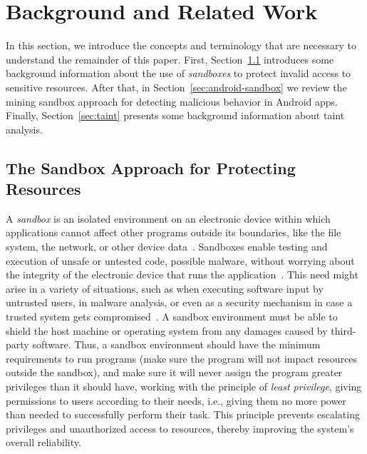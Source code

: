 \section{Background and Related Work}


In this section, we introduce the concepts and terminology that are necessary to understand the remainder of this paper. First, Section~\ref{sec:sandbox} introduces some background information about the use of \emph{sandboxes} to protect invalid access to sensitive resources. After that, in Section~\ref{sec:android-sandbox} we review the mining sandbox approach for detecting malicious behavior in Android apps. Finally, Section~\ref{sec:taint} presents some background information about taint analysis.

\subsection{The Sandbox Approach for Protecting Resources}\label{sec:sandbox}

A \emph{sandbox} is an isolated environment on an electronic device within which applications cannot affect other programs outside its boundaries, like the file system, the network, or other device data~\cite{DBLP:journals/peerj-cs/MaassSCS16}. Sandboxes enable testing and execution of unsafe or untested code, possible malware, without worrying about the integrity of the electronic device that runs the application~\cite{DBLP:conf/esorics/BordoniCS17}. This need might arise in a variety of situations, such as when executing software input by untrusted users, in malware analysis, or even as a security mechanism in case a trusted system gets compromised~\cite{DBLP:journals/peerj-cs/MaassSCS16}.
A sandbox environment must be able to shield the host machine or operating system from any damages caused by third-party software. Thus, a sandbox environment should have the minimum requirements to run programs (make sure the program will not impact resources outside the sandbox), and make sure it will never assign the program greater privileges than it should have, working with the principle of \emph{least privilege}, giving permissions to users according to their needs, i.e., giving them no more power than needed to successfully perform their task. This principle prevents escalating privileges and unauthorized access to resources, thereby improving the system's overall reliability.

